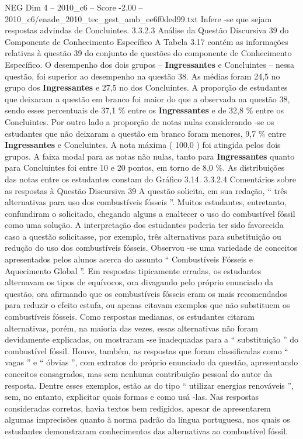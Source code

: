 \begin{textsample}{NEG Dim 4 – 2010\_c6 – Score -2.00 – 2010\_c6/enade\_2010\_tec\_gest\_amb\_ee6f0ded99.txt}
Infere -se que sejam respostas advindas de Concluintes. 3.3.2.3 Análise da Questão Discursiva 39 do Componente de Conhecimento Específico A Tabela 3.17 contém as informações relativas à questão 39 do conjunto de questões do componente de Conhecimento Específico.
O desempenho dos dois grupos – \textbf{Ingressantes} e Concluintes – nessa questão, foi superior ao desempenho na questão 38.
As médias foram 24,5 no grupo dos \textbf{Ingressantes} e 27,5 no dos Concluintes.
A proporção de estudantes que deixaram a questão em branco foi maior do que a observada na questão 38, sendo esses percentuais de 37,1 \% entre os \textbf{Ingressantes} e de 32,8 \% entre os Concluintes.
Por outro lado a proporção de notas nulas considerando -se os estudantes que não deixaram a questão em branco foram menores, 9,7 \% entre \textbf{Ingressantes} e Concluintes.
A nota máxima ( 100,0 ) foi atingida pelos dois grupos.
A faixa modal para as notas não nulas, tanto para \textbf{Ingressantes} quanto para Concluintes foi entre 10 e 20 pontos, em torno de 8,0 \%.
As distribuições das notas entre os estudantes constam do Gráfico 3.14. 3.3.2.4 Comentários sobre as respostas à Questão Discursiva 39 A questão solicita, em sua redação, “ três alternativas para uso dos combustíveis fósseis ”.
Muitos estudantes, entretanto, confundiram o solicitado, chegando alguns a enaltecer o uso do combustível fóssil como uma solução.
A interpretação dos estudantes poderia ter sido favorecida caso a questão solicitasse, por exemplo, três alternativas para substituição ou redução do uso dos combustíveis fósseis.
Observou -se uma variedade de conceitos apresentados pelos alunos acerca do assunto “ Combustíveis Fósseis e Aquecimento Global ”.
Em respostas tipicamente erradas, os estudantes alternavam os tipos de equívocos, ora divagando pelo próprio enunciado da questão, ora afirmando que os combustíveis fósseis eram os mais recomendados para reduzir o efeito estufa, ou apenas citavam exemplos que não substituem os combustíveis fósseis.
Como respostas medianas, os estudantes citaram alternativas, porém, na maioria das vezes, essas alternativas não foram devidamente explicadas, ou mostraram -se inadequadas para a “ substituição ” do combustível fóssil.
Houve, também, as respostas que foram classificadas como “ vagas ” e “ óbvias ”, com extratos do próprio enunciado da questão, apresentando conceitos consagrados, mas sem nenhuma contribuição pessoal do autor da resposta.
Dentre esses exemplos, estão as do tipo “ utilizar energias renováveis ”, sem, no entanto, explicitar quais formas e como usá -las.
Nas respostas consideradas corretas, havia textos bem redigidos, apesar de apresentarem algumas imprecisões quanto à norma padrão da língua portuguesa, nos quais os estudantes demonstraram conhecimentos das alternativas ao combustível fóssil.

\end{textsample}
